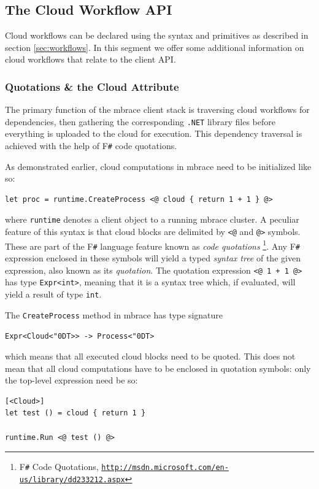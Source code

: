 \documentclass[9pt,a4paper]{article}
\newcommand{\mbrace}{mbrace}
\newcommand{\fsharp}{F\texttt \#}
\newcommand{\dotnet}{\texttt{\hbox{.}NET}}
\newcommand{\samehref}[1]{\href{#1}{\texttt{#1}}}
\newcommand{\centertt}[1]{\begin{center}\texttt{#1}\end{center}}
\newcommand{\uq}{\char"0D}
\begin{document}
\subsection{The Cloud Workflow API}
\label{sec:client:workflows}

Cloud workflows can be declared using the syntax and primitives as described in section \ref{sec:workflows}.
In this segment we offer some additional information on cloud workflows that relate to the client API.

\subsubsection*{Quotations \& the Cloud Attribute}

The primary function of the \mbrace{} client stack is traversing cloud workflows for dependencies,
then gathering the corresponding \dotnet{} library files before everything is uploaded to the cloud
for execution. This dependency traversal is achieved with the help of \fsharp{} code quotations.

As demonstrated earlier, cloud computations in \mbrace{} need to be initialized like so:
\begin{lstlisting}
let proc = runtime.CreateProcess <@ cloud { return 1 + 1 } @>
\end{lstlisting}
where \texttt{runtime} denotes a client object to a running \mbrace{} cluster.
A peculiar feature of this syntax is that cloud blocks are delimited by \texttt{<@} and 
\texttt{@>} symbols. These are part of the \fsharp{} language feature known as \emph{code quotations}%
\footnote{\fsharp{} Code Quotations, \samehref{http://msdn.microsoft.com/en-us/library/dd233212.aspx}}.
Any \fsharp{} expression enclosed in these symbols will yield a
typed \emph{syntax tree} of the given expression, also known as its \emph{quotation}.
The quotation expression \texttt{<@ 1 + 1 @>} has type \texttt{Expr<int>}, meaning that it is a syntax 
tree which, if evaluated, will yield a result of type \texttt{int}.

The \texttt{CreateProcess} method in \mbrace{} has type signature
\centertt{Expr<Cloud<\uq{}T>> -> Process<\uq{}T>}
which means that all executed cloud blocks need to be quoted.
This does not mean that all cloud computations have to be enclosed in quotation symbols:
only the top-level expression need be so:
\begin{lstlisting}
[<Cloud>]
let test () = cloud { return 1 }

runtime.Run <@ test () @>
\end{lstlisting}
\end{document}
